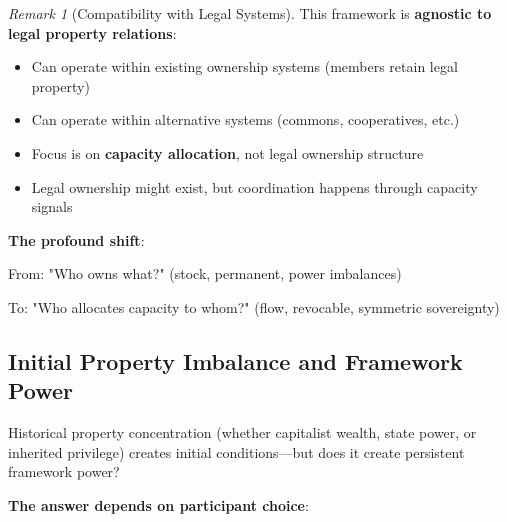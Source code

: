 \documentclass[11pt,a4paper]{article}
\theoremstyle{definition}
\theoremstyle{remark}
\newtheorem{remark}[theorem]{Remark}
\begin{document}
\begin{remark}[Compatibility with Legal Systems]
This framework is \textbf{agnostic to legal property relations}:
\begin{itemize}
\item Can operate within existing ownership systems (members retain legal property)
\item Can operate within alternative systems (commons, cooperatives, etc.)
\item Focus is on \textbf{capacity allocation}, not legal ownership structure
\item Legal ownership might exist, but coordination happens through capacity signals
\end{itemize}
\end{remark}

\textbf{The profound shift}:

From: "Who owns what?" (stock, permanent, power imbalances)

To: "Who allocates capacity to whom?" (flow, revocable, symmetric sovereignty)

\subsection{Initial Property Imbalance and Framework Power}

Historical property concentration (whether capitalist wealth, state power, or inherited privilege) creates initial conditions—but does it create persistent framework power?

\textbf{The answer depends on participant choice}:

\begin{center}
\end{center}
\end{document}
